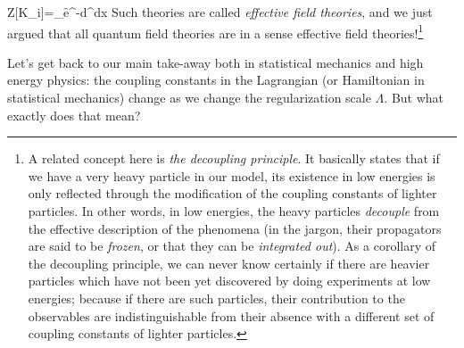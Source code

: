 \documentclass[12pt]{article}
\numberwithin{equation}{section}
\begin{document}
\be 
Z[K_i]=\int_\Lambda \cD \f e^{-\int d^dx}
\ee 
Such theories are called \emph{effective field theories}, and we just argued that all quantum field theories are in a sense effective field theories!\footnote{
A related concept here is \emph{the decoupling principle}. It basically states that if we have a very heavy particle in our model, its existence in low energies is only reflected through the modification of the coupling constants of lighter particles. In other words, in low energies, the heavy particles \emph{decouple} from the effective description of the phenomena (in the jargon, their propagators are said to be \emph{frozen}, or that they can be\emph{ integrated out}). As a corollary of the decoupling principle, we can never know certainly if there are heavier particles which have not been yet discovered by doing experiments at low energies; because if there are such particles, their contribution to the observables are indistinguishable from their absence with a different set of coupling constants of lighter particles.
}

Let's get back to our main take-away both in statistical mechanics and high energy physics: the coupling constants in the Lagrangian (or Hamiltonian in statistical mechanics) change as we change the regularization scale $\Lambda$. But what exactly does that mean?
\end{document}
